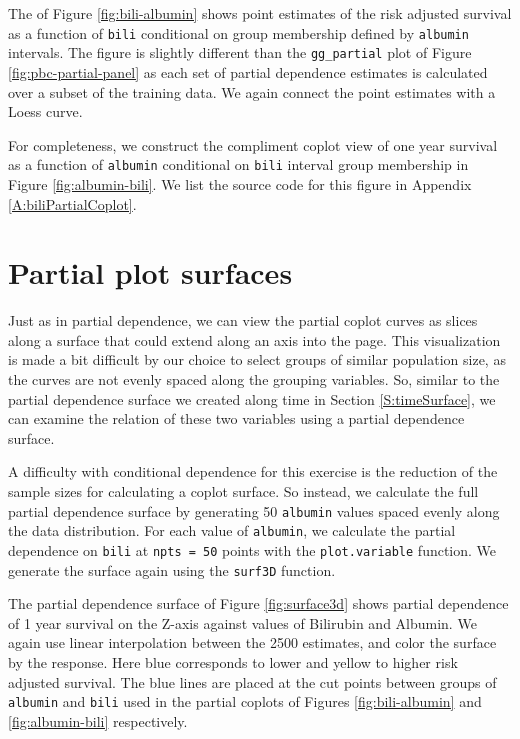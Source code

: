 \documentclass[article, nojss]{jss}
\begin{document}
The  of Figure \ref{fig:bili-albumin} shows
point estimates of the risk adjusted survival as a function of
\texttt{bili} conditional on group membership defined by
\texttt{albumin} intervals. The figure is slightly different than the
\texttt{gg\_partial} plot of Figure \ref{fig:pbc-partial-panel} as each
set of partial dependence estimates is calculated over a subset of the
training data. We again connect the point estimates with a Loess curve.

For completeness, we construct the compliment coplot view of one year
survival as a function of \texttt{albumin} conditional on \texttt{bili}
interval group membership in Figure \ref{fig:albumin-bili}. We list the
source code for this figure in Appendix \ref{A:biliPartialCoplot}.

\section{Partial plot surfaces}\label{partial-plot-surfaces}

Just as in partial dependence, we can view the partial coplot curves as
slices along a surface that could extend along an axis into the page.
This visualization is made a bit difficult by our choice to select
groups of similar population size, as the curves are not evenly spaced
along the grouping variables. So, similar to the partial dependence
surface we created along time in Section \ref{S:timeSurface}, we can
examine the relation of these two variables using a partial dependence
surface.

A difficulty with conditional dependence for this exercise is the
reduction of the sample sizes for calculating a coplot surface. So
instead, we calculate the full partial dependence surface by generating
50 \texttt{albumin} values spaced evenly along the data distribution.
For each value of \texttt{albumin}, we calculate the partial dependence
on \texttt{bili} at \texttt{npts\ =\ 50} points with the
\texttt{plot.variable} function. We generate the surface again using the
\texttt{surf3D} function.

The partial dependence surface of Figure \ref{fig:surface3d} shows
partial dependence of 1 year survival on the Z-axis against values of
Bilirubin and Albumin. We again use linear interpolation between the
2500 estimates, and color the surface by the response. Here blue
corresponds to lower and yellow to higher risk adjusted survival. The
blue lines are placed at the cut points between groups of
\texttt{albumin} and \texttt{bili} used in the partial coplots of
Figures \ref{fig:bili-albumin} and \ref{fig:albumin-bili} respectively.
\end{document}
